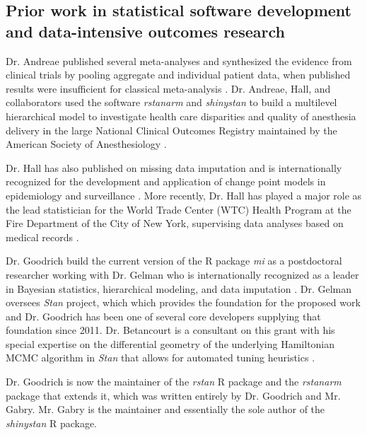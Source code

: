 \documentclass[11pt,notitlepage]{article}
\begin{document}
\subsection*{Prior work in statistical software development and data-intensive outcomes research}
 
Dr. Andreae published several meta-analyses and synthesized the evidence 
from clinical trials by pooling aggregate and individual patient data, when 
published results were insufficient for classical meta-analysis 
\cite{AndreaeJohnsonAbstract2013, Andreae2013, Andreae2015, Carter2015, Atchabahian2015}. Dr. Andreae, Hall, and 
collaborators used the software \textit{rstanarm} and \textit{shinystan} to build a multilevel 
hierarchical model to investigate health care disparities and quality of 
anesthesia delivery in the large National Clinical Outcomes Registry maintained 
by the American Society of Anesthesiology \cite{AndreaeWhite2015}. 

Dr. Hall has also published on missing data 
imputation \cite{Hall2009a, Wang_20029935, Wang_20029935} and is internationally 
recognized for the development and application of change point models in 
epidemiology and surveillance \cite{Hall2000, Hall2001, Hall2003bayesian, Hall2009, Hall2015}. 
More recently, Dr. Hall has played a major role as the lead statistician 
for the World Trade Center (WTC) Health Program at the Fire Department 
of the City of New York, supervising data analyses based on medical 
records \cite{Aldrich2010, Hall2015, Zeig-Owens2011}.

Dr. Goodrich build the current version of the R package \textit{mi} as a postdoctoral researcher working with
Dr. Gelman \cite{miCRAN} who is internationally recognized as a leader in Bayesian statistics, hierarchical 
modeling, and data imputation \cite{Gelman1998notasked, Gelman2001imputation, Hoffman2014, Gelman-Hill_2014}. 
Dr. Gelman oversees \textit{Stan}\cite{Stan_Software_2014} project, which which provides the foundation for the 
proposed work and Dr. Goodrich has been one of several core developers supplying that foundation since 2011.  
Dr. Betancourt is a consultant on this grant with his special expertise on the differential 
geometry of the underlying Hamiltonian MCMC algorithm in \textit{Stan} that allows for automated tuning heuristics
\cite{BetancourtGeometry2016}.

Dr. Goodrich is now the maintainer of the \textit{rstan} R package and the \textit{rstanarm} package that extends
it, which was written entirely by Dr. Goodrich and Mr. Gabry. Mr. Gabry is the maintainer and essentially the
sole author of the \textit{shinystan} R package.
\end{document}
